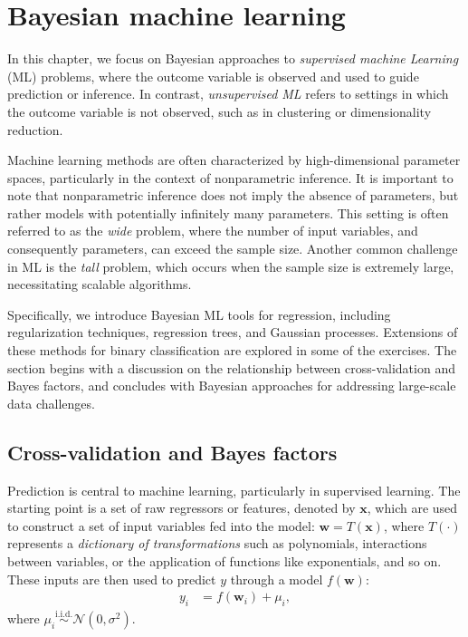 \chapter{Bayesian machine learning}\label{chap13}

In this chapter, we focus on Bayesian approaches to \textit{supervised machine Learning} (ML) problems, where the outcome variable is observed and used to guide prediction or inference. In contrast, \textit{unsupervised ML} refers to settings in which the outcome variable is not observed, such as in clustering or dimensionality reduction.

Machine learning methods are often characterized by high-dimensional parameter spaces, particularly in the context of nonparametric inference. It is important to note that nonparametric inference does not imply the absence of parameters, but rather models with potentially infinitely many parameters. This setting is often referred to as the \textit{wide} problem, where the number of input variables, and consequently parameters, can exceed the sample size. Another common challenge in ML is the \textit{tall} problem, which occurs when the sample size is extremely large, necessitating scalable algorithms.

Specifically, we introduce Bayesian ML tools for regression, including regularization techniques, regression trees, and Gaussian processes. Extensions of these methods for binary classification are explored in some of the exercises. The section begins with a discussion on the relationship between cross-validation and Bayes factors, and concludes with Bayesian approaches for addressing large-scale data challenges.

\section{Cross-validation and Bayes factors}\label{sec13_1}
Prediction is central to machine learning, particularly in supervised learning. The starting point is a set of raw regressors or features, denoted by \( \mathbf{x} \), which are used to construct a set of input variables fed into the model: \( \mathbf{w} = T(\mathbf{x}) \), where \( T(\cdot) \) represents a \textit{dictionary of transformations} such as polynomials, interactions between variables, or the application of functions like exponentials, and so on. These inputs are then used to predict \( y \) through a model \( f(\mathbf{w}) \):
\begin{align*}
	y_i &= f(\mathbf{w}_i) + \mu_i,
\end{align*}
where \( \mu_i \stackrel{\text{i.i.d.}}{\sim} \mathcal{N}(0, \sigma^2) \).

